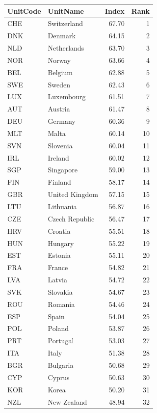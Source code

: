\documentclass[
]{book}
\begin{document}
\begin{tabular}{l|l|r|r}
\hline
UnitCode & UnitName & Index & Rank\\
\hline
CHE & Switzerland & 67.70 & 1\\
\hline
DNK & Denmark & 64.15 & 2\\
\hline
NLD & Netherlands & 63.70 & 3\\
\hline
NOR & Norway & 63.66 & 4\\
\hline
BEL & Belgium & 62.88 & 5\\
\hline
SWE & Sweden & 62.43 & 6\\
\hline
LUX & Luxembourg & 61.51 & 7\\
\hline
AUT & Austria & 61.47 & 8\\
\hline
DEU & Germany & 60.36 & 9\\
\hline
MLT & Malta & 60.14 & 10\\
\hline
SVN & Slovenia & 60.04 & 11\\
\hline
IRL & Ireland & 60.02 & 12\\
\hline
SGP & Singapore & 59.00 & 13\\
\hline
FIN & Finland & 58.17 & 14\\
\hline
GBR & United Kingdom & 57.15 & 15\\
\hline
LTU & Lithuania & 56.87 & 16\\
\hline
CZE & Czech Republic & 56.47 & 17\\
\hline
HRV & Croatia & 55.51 & 18\\
\hline
HUN & Hungary & 55.22 & 19\\
\hline
EST & Estonia & 55.11 & 20\\
\hline
FRA & France & 54.82 & 21\\
\hline
LVA & Latvia & 54.72 & 22\\
\hline
SVK & Slovakia & 54.67 & 23\\
\hline
ROU & Romania & 54.46 & 24\\
\hline
ESP & Spain & 54.04 & 25\\
\hline
POL & Poland & 53.87 & 26\\
\hline
PRT & Portugal & 53.03 & 27\\
\hline
ITA & Italy & 51.38 & 28\\
\hline
BGR & Bulgaria & 50.68 & 29\\
\hline
CYP & Cyprus & 50.63 & 30\\
\hline
KOR & Korea & 50.20 & 31\\
\hline
NZL & New Zealand & 48.94 & 32\\
\hline

\end{tabular}
\end{document}
